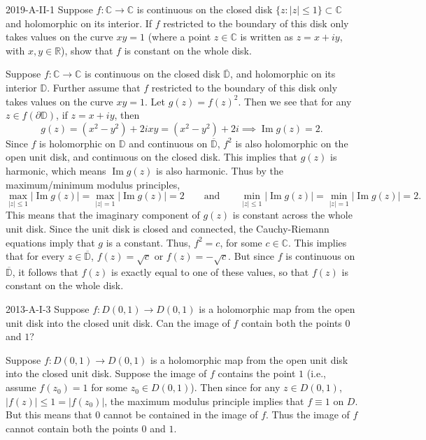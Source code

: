 \documentclass{article}
\begin{document}
	\begin{prb}{2019-A-II-1}
		Suppose $f: \mathbb{C} \to \mathbb{C}$ is continuous on the closed disk $\{z: |z| \leq 1\} \subset \mathbb{C}$ and holomorphic on its interior. If $f$ restricted to the boundary of this disk only takes values on the curve $xy = 1$ (where a point $z \in \mathbb{C}$ is written as $z = x + iy$, with $x, y \in \mathbb{R}$), show that $f$ is constant on the whole disk. 
	\end{prb}
	Suppose $f: \mathbb{C} \to \mathbb{C}$ is continuous on the closed disk $\overline{\mathbb{D}}$, and holomorphic on its interior $\mathbb{D}$. Further assume that $f$ restricted to the boundary of this disk only takes values on the curve $xy = 1$. Let $g(z) = f(z)^{2}$. Then we see that for any $z \in f(\partial \mathbb{D})$, if $z = x + iy$, then  
	\begin{equation*}
		g(z) = (x^{2}-  y^{2}) + 2ixy = (x^{2} -  y^{2}) + 2i \implies \operatorname{Im}{g(z)} = 2. 
	\end{equation*}
	Since $f$ is holomorphic on $\mathbb{D}$ and continuous on $\overline{\mathbb{D}}$, $f^{2}$ is also holomorphic on the open unit disk, and continuous on the closed disk. This implies that $g(z)$ is harmonic, which means $\operatorname{Im}{g(z)}$ is also harmonic. Thus by the maximum/minimum modulus principles,
	\begin{equation*}
		\max_{|z| \leq 1}|\operatorname{Im}{g(z)}| = \max_{|z| = 1}|\operatorname{Im}{g(z)}| = 2 \qquad \text{and} \qquad \min_{|z| \leq 1}|\operatorname{Im}{g(z)}| = \min_{|z| = 1}|\operatorname{Im}{g(z)}| = 2. 
	\end{equation*}
	This means that the imaginary component of $g(z)$ is constant across the whole unit disk. Since the unit disk is closed and connected, the Cauchy-Riemann equations imply that $g$ is a constant. Thus, $f^{2} = c$, for some $c \in \mathbb{C}$. This implies that for every $z \in \overline{\mathbb{D}}$, $f(z) = \sqrt{c}$ or $f(z) = -\sqrt{c}$. But since $f$ is continuous on $\overline{\mathbb{D}}$, it follows that $f(z)$ is exactly equal to one of these values, so that $f(z)$ is constant on the whole disk. 
	
	\begin{prb}{2013-A-I-3}
		Suppose $f: D(0,1) \to D(0,1)$ is a holomorphic map from the open unit disk into the closed unit disk. Can the image of $f$ contain both the points $0$ and $1$? 
	\end{prb}
	Suppose $f: D(0,1) \to D(0,1)$ is a holomorphic map from the open unit disk into the closed unit disk. Suppose the image of $f$ contains the point $1$ (i.e., assume $f(z_{0}) = 1$ for some $z_{0} \in D(0,1)$). Then since for any $z \in D(0,1)$, $|f(z)| \leq 1 = |f(z_{0})|$, the maximum modulus principle implies that $f \equiv 1$ on $D$. But this means that $0$ cannot be contained in the image of $f$. Thus the image of $f$ cannot contain both the points $0$ and $1$. 
	
\end{document}

